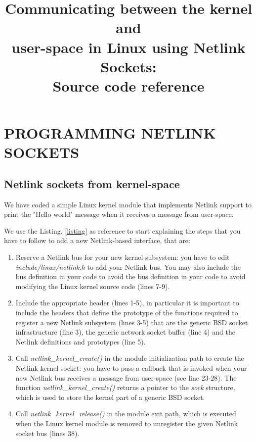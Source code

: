 \documentclass[10pt,onecolumn]{article}
\begin{document}
\title{Communicating between the kernel and \\ user-space in Linux using Netlink Sockets: \\ Source code reference}
\author{}
\date{}
\maketitle

\section{PROGRAMMING NETLINK SOCKETS}
\subsection{Netlink sockets from kernel-space}
We have coded a simple Linux kernel module that implements Netlink support to print the "Hello world" message when it receives a message from user-space.

We use the Listing. \ref{listing} as reference to start explaining the steps that you have to follow to add a new Netlink-based interface, that are:

\begin{enumerate}
  \item Reserve a Netlink bus for your new kernel subsystem: you have to edit \textit{include/linux/netlink.h} to add your Netlink bus. You may also include the bus definition in your code to avoid the bus definition in your code to avoid modifying the Linux kernel source code (lines 7-9).
  \item Include the appropriate header (lines 1-5), in particular it is important to include the headers that define the prototype of the functions required to register a new Netlink subsystem (lines 3-5) that are the generic BSD socket infrastructure (line 3), the generic network socket buffer (line 4) and the Netlink definitions and prototypes (line 5).
  \item Call \textit{netlink\_kernel\_create()} in the module initialization path to create the Netlink kernel socket: you have to pass a callback that is invoked when your new Netlink bus receives a message from user-space (see line 23-28). The function \textit{netlink\_kernel\_create()} returns a pointer to the \textit{sock} structure, which is used to store the kernel part of a generic BSD socket.
  \item Call \textit{netlink\_kernel\_release()} in the module exit path, which is executed when the Linux kernel module is removed to unregister the given Netlink socket bus (lines 38).
\end{enumerate}
\end{document}

